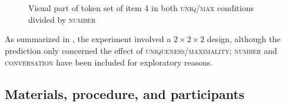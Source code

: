 \documentclass[output=paper]{langscibook}
\begin{document}
\begin{figure*}
\centering
\hspace{.3cm}
~
\vspace{.3cm}

\hspace{.3cm}
~
\caption{Visual part of token set of item 4 in both \textsc{uniq/max} conditions divided by \textsc{number}}\label{sim-dem:fig:window}
\end{figure*}

As summarized in , the experiment involved a $2\times 2\times 2$ design, although the prediction only concerned the effect of \textsc{uniqueness/maximality}; \textsc{number} and \textsc{conversation} have been included for exploratory reasons.

\subsection{Materials, procedure, and participants}\label{sim-dem:sec:materials}
\end{document}
